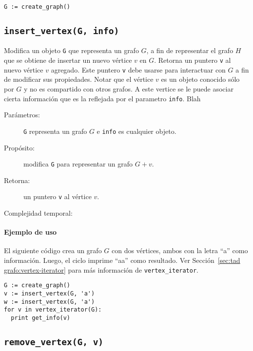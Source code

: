 \documentclass[a4paper,12pt]{article}
\begin{document}
\begin{lstlisting}
G := create_graph()
\end{lstlisting}


\subsection{\texttt{insert\_vertex(G, info)}}
\label{sec:tad grafo:insert-vertex}

Modifica un objeto \texttt{G} que representa un grafo $G$, a fin de representar el grafo $H$ que se obtiene de insertar un nuevo vértice $v$ en $G$.  Retorna un puntero \texttt{v} al nuevo vértice $v$ agregado.  Este puntero \texttt{v} debe usarse para interactuar con $G$ a fin de modificar sus propiedades.  Notar que el vértice $v$ es un objeto conocido sólo por $G$ y no es compartido con otros grafos.  A este vertice se le puede asociar cierta información que es la reflejada por el parametro \texttt{info}.  Blah
  
\begin{description}
  \item [Parámetros:] \texttt{G} representa un grafo $G$ e \texttt{info} es cualquier objeto.
  \item [Propósito:] modifica \texttt{G} para representar un grafo $G + v$.
  \item [Retorna:] un puntero \texttt{v} al vértice $v$.
  \item [Complejidad temporal:]
\end{description}

\paragraph{Ejemplo de uso}

El siguiente código crea un grafo $G$ con dos vértices, ambos con la letra ``a'' como información.  Luego, el ciclo imprime ``aa'' como resultado.  Ver Sección~\ref{sec:tad grafo:vertex-iterator} para más información de \texttt{vertex\_iterator}.

\begin{lstlisting}
G := create_graph()
v := insert_vertex(G, 'a')
w := insert_vertex(G, 'a')
for v in vertex_iterator(G):
  print get_info(v)
\end{lstlisting}


\subsection{\texttt{remove\_vertex(G, v)}}
\label{sec:tad grafo:remove-vertex}
\end{document}
